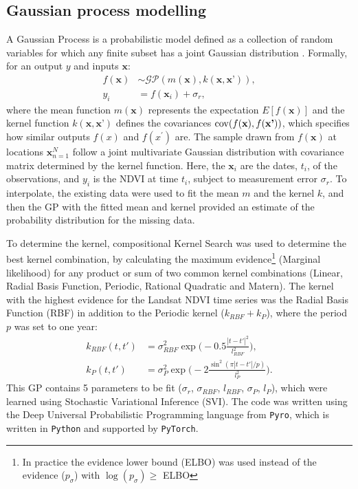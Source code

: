 \documentclass[review]{elsarticle}
\begin{document}
\subsection{Gaussian process modelling} \label{sec:GPM}
A Gaussian Process is a probabilistic model defined as a collection of random variables for which any finite subset has a joint Gaussian distribution \citep{gpm}. Formally, for an output $y$ and inputs $\textbf{x}$:
\begin{align}
	f(\textbf{x}) &\sim \mathcal{GP}(m(\textbf{x}), k(\textbf{x},\textbf{x'})),\\
	y_i &= f(\textbf{x}_i) + \sigma_r,
\end{align}
where the mean function $m(\textbf{x})$ represents the expectation $E[f(\textbf{x})]$ and the kernel function $k(\textbf{x}, \textbf{x'})$ defines the covariances ${\rm cov}(f(\textbf{x}), f(\textbf{x'}))$, which specifies how similar outputs $f(x)$ and $f(x^\prime)$ are. The sample drawn from $f(\textbf{x})$ at locations ${\textbf{x}}_{n=1}^N$ follow a joint multivariate Gaussian distribution with covariance matrix determined by the kernel function. Here, the $\textbf{x}_i$ are the dates, $t_i$, of the observations, and $y_i$ is the NDVI at time $t_i$, subject to measurement error $\sigma_r$. To interpolate, the existing data were used to fit the mean $m$ and the kernel $k$, and then the GP with the fitted mean and kernel provided an estimate of the probability distribution for the missing data.

 To determine the kernel, compositional Kernel Search \citep{pmlr-v28-duvenaud13} was used to determine the best kernel combination, by calculating the maximum evidence\footnote{In practice the evidence lower bound (ELBO) was used instead of the evidence ($p_\sigma$) with $\log(p_\sigma) \ge$ ELBO} (Marginal likelihood) for any product or sum of two common kernel combinations (Linear,  Radial Basis Function, Periodic, Rational Quadratic and Matern). The kernel with the highest evidence for the Landsat NDVI time series was the Radial Basis Function (RBF) in addition to the Periodic kernel ($k_{RBF}+k_P $), where the period $p$ was set to one year:
\begin{align}
	k_{RBF}(t,t') &= \sigma_{RBF}^2 \exp{\Big( -0.5 \frac{|t-t'|^2}{l_{RBF}^2} \Big) }, \label{eq:eqr} \\
	k_P(t,t') &=    \sigma_{P}^2 \exp{\Big(-2 \frac{\sin^2(\pi |t-t'|/p)}{l_{P}^2}\Big)}. \label{eq:eqP}
\end{align}
This GP contains 5 parameters to be fit ($\sigma_r$, $\sigma_{RBF}$, $l_{RBF}$, $\sigma_{P}$, $l_{P}$), which were learned using Stochastic Variational Inference (SVI). The code was written using the Deep Universal Probabilistic Programming language from \texttt{Pyro}, which is written in \texttt{Python} and supported by \texttt{PyTorch}. 
\end{document}
